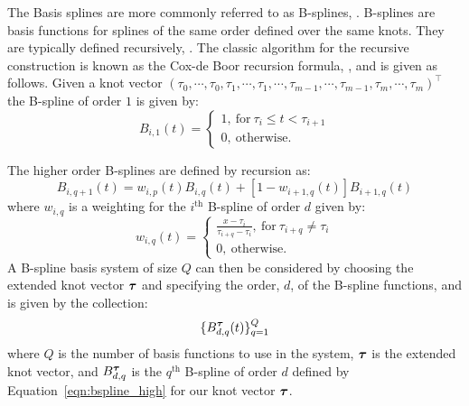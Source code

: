 The Basis splines are more commonly referred to as B-splines, \citep{knott_interpolating_2000}.
B-splines are basis functions for splines of the same order defined over the same knots.
They are typically defined recursively, \citep{knott_interpolating_2000, de_boor_practical_2001}.
The classic algorithm for the recursive construction is known as the Cox-de Boor recursion formula, \citep{de_boor_practical_2001}, and is given as follows.
Given a knot vector $(\tau_0,\cdots,\tau_0, \tau_1,\cdots,  \tau_1, \cdots, \tau_{m-1},\cdots, \tau_{m-1}, \tau_m,\cdots, \tau_m)^\top$ the B-spline of order $1$ is given by:
\begin{equation}	\label{eqn:bspline1}
	B_{i, 1}\left( t \right) = \begin{cases} 1,~\text{for}~\tau_i \le t < \tau_{i+1} \\ 0,~\text{otherwise.} \end{cases}
\end{equation}

The higher order B-splines are defined by recursion as:
\begin{equation}\label{eqn:bspline_high}
	B_{i, q+1}(t) = w_{i, p}(t) B_{i, q}(t) + \left[ 1 - w_{i+1, q}(t) \right]B_{i+1, q}(t)
\end{equation}
where $w_{i, q}$ is a weighting for the $i^\text{th}$ B-spline of order $d$ given by:
\begin{equation}
	w_{i, q}(t) = \begin{cases} \frac{x-\tau_i}{\tau_{i+q} - \tau_i} ,~\text{for}~\tau_{i+q} \ne \tau_i \\ 0,~\text{otherwise.} \end{cases}
	\label{eqn:weighting}
\end{equation}
A B-spline basis system of size $Q$ can then be considered by choosing the extended knot vector $\bm{{\tau}}$ and specifying the order, $d$, of the B-spline functions, and is given by the collection:
\begin{equation}
	\{ B_{d, q}^{\bm{{\tau}}}(t)\}_{q=1}^{Q}
	\label{eqn:bspline_basis}
\end{equation}
where $Q$ is the number of basis functions to use in the system, $\bm{{\tau}}$ is the extended knot vector, and $B_{d, q}^{\bm{{\tau}}}$ is the $q^\text{th}$ B-spline of order $d$ defined by Equation~\eqref{eqn:bspline_high} for our knot vector $\bm{{\tau}}$.

